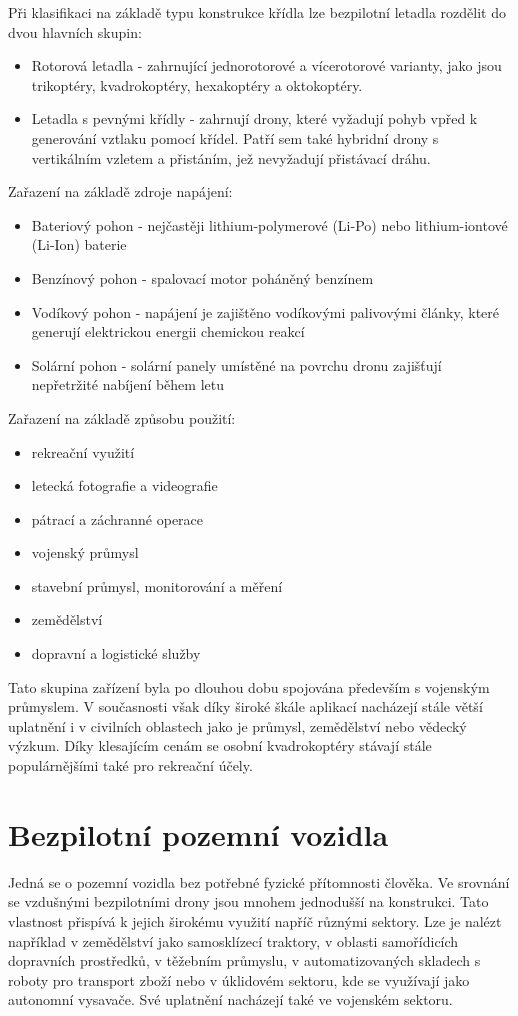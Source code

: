 \documentclass[12pt]{report}
\begin{document}
Při klasifikaci na základě typu konstrukce křídla lze bezpilotní letadla rozdělit do dvou hlavních skupin:
\begin{itemize}
	\item Rotorová letadla - zahrnující jednorotorové a vícerotorové varianty, jako jsou trikoptéry, kvadrokoptéry, hexakoptéry a oktokoptéry.
	\item Letadla s pevnými křídly - zahrnují drony, které vyžadují pohyb vpřed k generování vztlaku pomocí křídel. Patří sem také hybridní drony s vertikálním vzletem a přistáním, jež nevyžadují přistávací dráhu.
\end{itemize}

Zařazení na základě zdroje napájení:
\begin{itemize}
	\item Bateriový pohon - nejčastěji lithium-polymerové (Li-Po) nebo lithium-iontové (Li-Ion) baterie
	\item Benzínový pohon - spalovací motor poháněný benzínem
	\item Vodíkový pohon - napájení je zajištěno vodíkovými palivovými články, které generují elektrickou energii chemickou reakcí
	\item Solární pohon - solární panely umístěné na povrchu dronu zajišťují nepřetržité nabíjení během letu
\end{itemize}

Zařazení na základě způsobu použití:
\begin{itemize}
	\item rekreační využití
	\item letecká fotografie a videografie
	\item pátrací a záchranné operace
	\item vojenský průmysl
	\item stavební průmysl, monitorování a měření
	\item zemědělství
	\item dopravní a logistické služby
\end{itemize}

Tato skupina zařízení byla po dlouhou dobu spojována především s vojenským průmyslem. V současnosti však díky široké škále aplikací nacházejí stále větší uplatnění i v civilních oblastech jako je průmysl, zemědělství nebo vědecký výzkum. Díky klesajícím cenám se osobní kvadrokoptéry stávají stále populárnějšími také pro rekreační účely. \cite{mainbook} \cite{whatisadrone}\\

\section[Bezpilotní pozemní vozidla]{Bezpilotní pozemní vozidla}
Jedná se o pozemní vozidla bez potřebné fyzické přítomnosti člověka. Ve srovnání se vzdušnými bezpilotními drony jsou mnohem jednodušší na konstrukci. Tato vlastnost přispívá k jejich širokému využití napříč různými sektory. Lze je nalézt například v zemědělství jako samosklízecí traktory, v oblasti samořídicích dopravních prostředků, v těžebním průmyslu, v automatizovaných skladech s roboty pro transport zboží nebo v úklidovém sektoru, kde se využívají jako autonomní vysavače. Své uplatnění nacházejí také ve vojenském sektoru. \cite{mainbook}
\end{document}
